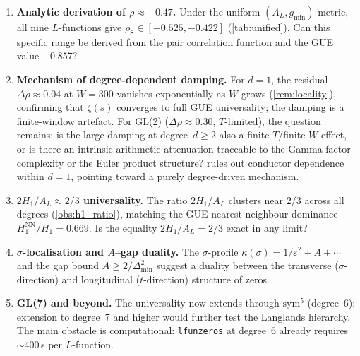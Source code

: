 \documentclass[11pt,a4paper]{article}
\theoremstyle{plain}
\theoremstyle{definition}
\begin{document}
\begin{enumerate}
  \item \textbf{Analytic derivation of $\rho \approx -0.47$.}\;
        Under the uniform $(A_L, g_{\min})$ metric, all nine
        $L$-functions give $\rho_{\mathrm{S}} \in [-0.525, -0.422]$
        (\cref{tab:unified}).  Can this specific range
        be derived from the pair correlation function and the GUE
        value $-0.857$?
  \item \textbf{Mechanism of degree-dependent damping.}\;
        For $d = 1$, the residual $\Delta\rho \approx 0.04$ at
        $W = 300$ vanishes exponentially as $W$ grows
        (\cref{rem:locality}), confirming that $\zeta(s)$
        converges to full GUE universality; the damping is a
        finite-window artefact.  For GL(2)
        ($\Delta\rho \approx 0.30$, $T$-limited), the question
        remains: is the large damping at degree~$d \ge 2$ also a
        finite-$T$/finite-$W$ effect, or is there an intrinsic
        arithmetic attenuation traceable to the Gamma factor
        complexity or the Euler product structure?
         rules out conductor dependence
        within $d = 1$, pointing toward a purely degree-driven mechanism.
  \item \textbf{$2H_1/A_L \approx 2/3$ universality.}\;
        The ratio $2H_1/A_L$ clusters near $2/3$ across all
        degrees (\cref{obs:h1_ratio}), matching the GUE
        nearest-neighbour dominance $H_1^{\mathrm{NN}}/H_1 = 0.669$.
        Is the equality $2H_1/A_L = 2/3$ exact in any limit?
  \item \textbf{$\sigma$-localisation and $A$--gap duality.}\;
        The $\sigma$-profile $\kappa(\sigma) = 1/\varepsilon^2 + A + \cdots$
        and the gap bound $A \ge 2/\Delta_{\min}^2$ suggest a duality between
        the transverse ($\sigma$-direction) and longitudinal
        ($t$-direction) structure of zeros.
  \item \textbf{GL(7) and beyond.}\;
        The universality now extends through $\mathrm{sym}^5$
        (degree~6); extension to degree~7 and higher would
        further test the Langlands hierarchy.  The main
        obstacle is computational: \texttt{lfunzeros} at degree~6
        already requires $\sim\!400$\,s per $L$-function.
\end{enumerate}
\end{document}
